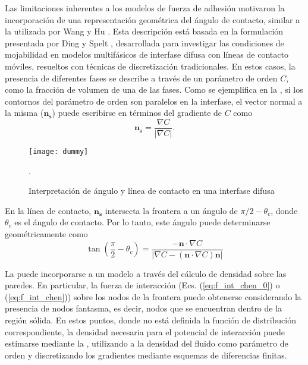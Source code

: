 Las limitaciones inherentes a los modelos de fuerza de adhesi\'on motivaron la incorporaci\'on de una representaci\'on geom\'etrica del \'angulo de contacto, similar a la utilizada por Wang \cite{wang_scheme_2013} y Hu \cite{hu_contact_2016}. Esta descripci\'on est\'a basada en la formulaci\'on presentada por Ding y Spelt \cite{ding_wetting_2007}, desarrollada para investigar las condiciones de mojabilidad en modelos multif\'asicos de interfase difusa con l\'ineas de contacto m\'oviles, resueltos con t\'ecnicas de discretizaci\'on tradicionales. En estos casos, la presencia de diferentes fases se describe a trav\'es de un par\'ametro de orden $C$, como la fracci\'on de volumen de una de las fases. Como se ejemplifica en la , si los contornos del par\'ametro de orden son paralelos en la interfase, el vector normal a la misma ($\bm{n_s}$) puede escribirse en t\'erminos del gradiente de $C$ como
\begin{equation}
	\bm{n_s} = \dfrac{\nabla C}{|\nabla C|}.
\end{equation}

\begin{figure}[ht]
	\centering
	\texttt{[image: dummy]}
	\caption{Interpretaci\'on de \'angulo y l\'inea de contacto en una interfase difusa}.
	\label{fig:ding_contacto}
\end{figure}

En la l\'inea de contacto, $\bm{n_s}$ intersecta la frontera a un \'angulo de $\pi/2 - \theta_c$, donde $\theta_c$ es el \'angulo de contacto. Por lo tanto, este \'angulo puede determinarse geom\'etricamente como 
\begin{equation}
	\tan \left( \dfrac{\pi}{2} - \theta_c \right) = \dfrac{-\bm{n} \cdot \nabla C}{|\nabla C - (\bm{n}\cdot \nabla C)\bm{n}|}
	\label{eq:ding_angulo}
\end{equation}

La  puede incorporarse a un modelo \pp{} a trav\'es del c\'alculo de densidad sobre las paredes. En particular, la fuerza de interacci\'on (Ecs. (\ref{eq:f_int_chen_0}) o (\ref{eq:f_int_chen})) sobre los nodos de la frontera puede obtenerse considerando la presencia de nodos fantasma, es decir, nodos que se encuentran dentro de la regi\'on s\'olida. En estos puntos, donde no est\'a definida la funci\'on de distribuci\'on correspondiente, la densidad necesaria para el potencial de interacci\'on puede estimarse mediante la , utilizando a la densidad del fluido como par\'ametro de orden y discretizando los gradientes mediante esquemas de diferencias finitas. 

